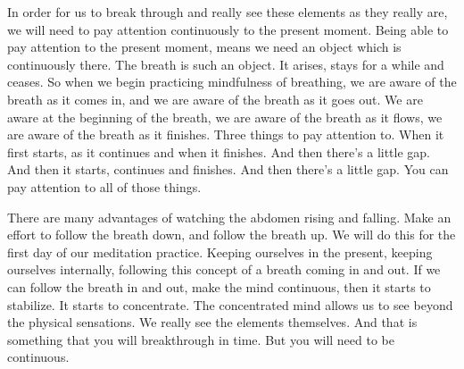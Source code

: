 \documentclass[letterpaper,10pt,english]{sphinxmanual}
\begin{document}
\sphinxAtStartPar
In order for us to break through and really see these elements as they
really are, we will need to pay attention continuously to the present moment.
Being able to pay attention to the present moment, means we need an object
which is continuously there. The breath is such an object. It arises, stays for
a while and ceases. So when we begin practicing mindfulness of breathing,
we are aware of the breath as it comes in, and we are aware of the breath as
it goes out. We are aware at the beginning of the breath, we are aware of the
  breath as it flows, we are aware of the breath as it finishes. Three things to
pay attention to. When it first starts, as it continues and when it finishes. And
then there’s a little gap. And then it starts, continues and finishes. And then
there’s a little gap. You can pay attention to all of those things.

\sphinxAtStartPar
There are many advantages of watching the abdomen rising and falling. Make an effort to follow the breath down, and follow the breath up. We
will do this for the first day of our meditation practice. Keeping ourselves in
the present, keeping ourselves internally, following this concept of a breath
coming in and out. If we can follow the breath in and out, make the mind
continuous,  then  it  starts  to  stabilize.  It  starts  to  concentrate. The  concentrated mind allows us to see beyond the physical sensations. We really see
the elements themselves. And that is something that you will breakthrough
in time. But you will need to be continuous.
\end{document}
